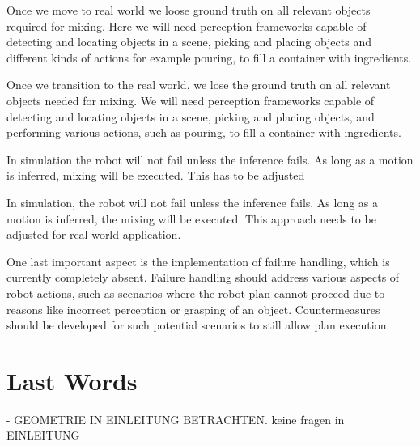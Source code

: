 Once we move to real world we loose ground truth on all relevant objects required for mixing.
Here we will need perception frameworks capable of detecting and locating objects in a scene, 
picking and placing objects and different kinds of actions for example pouring, to fill a container
with ingredients.

Once we transition to the real world, we lose the ground truth on all relevant objects needed for mixing. We will need perception frameworks capable of detecting and locating objects in a scene, picking and placing objects, and performing various actions, such as pouring, to fill a container with ingredients.

In simulation the robot will not fail unless the inference fails. As long as a motion is inferred, mixing will be executed.
This has to be adjusted

In simulation, the robot will not fail unless the inference fails. As long as a motion is inferred, the mixing will be executed. This approach needs to be adjusted for real-world application.

One last important aspect is the implementation of failure handling, which is currently completely absent. Failure handling should address various aspects of robot actions, such as scenarios where the robot plan cannot proceed due to reasons like incorrect perception or grasping of an object. Countermeasures should be developed for such potential scenarios to still allow plan execution.

\section{Last Words}

- GEOMETRIE IN EINLEITUNG BETRACHTEN.
keine fragen in EINLEITUNG